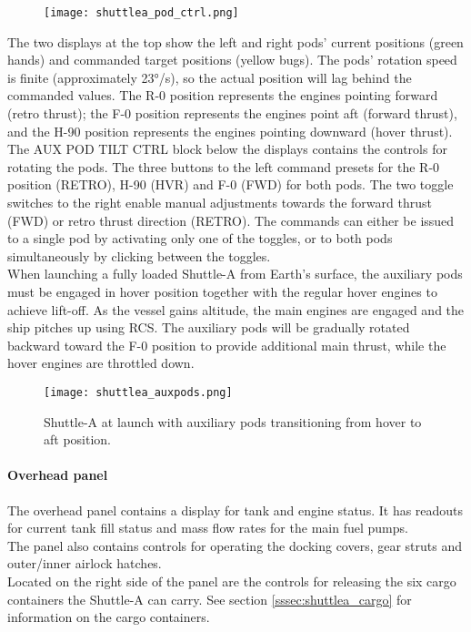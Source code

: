 \documentclass[Orbiter User Manual.tex]{subfiles}
\begin{document}
\begin{figure}[H]
  \centering
  \texttt{[image: shuttlea\_pod\_ctrl.png]}
\end{figure}

\noindent
The two displays at the top show the left and right pods' current positions (green hands) and commanded target positions (yellow bugs). The pods' rotation speed is finite (approximately 23°/s), so the actual position will lag behind the commanded values. The R-0 position represents the engines pointing forward (retro thrust); the F-0 position represents the engines point aft (forward thrust), and the H-90 position represents the engines pointing downward (hover thrust).\\
The AUX POD TILT CTRL block below the displays contains the controls for rotating the pods. The three buttons to the left command presets for the R-0 position (RETRO), H-90 (HVR) and F-0 (FWD) for both pods. The two toggle switches to the right enable manual adjustments towards the forward thrust (FWD) or retro thrust direction (RETRO). The commands can either be issued to a single pod by activating only one of the toggles, or to both pods simultaneously by clicking between the toggles.\\
When launching a fully loaded Shuttle-A from Earth's surface, the auxiliary pods must be engaged in hover position together with the regular hover engines to achieve lift-off. As the vessel gains altitude, the main engines are engaged and the ship pitches up using RCS. The auxiliary pods will be gradually rotated backward toward the F-0 position to provide additional main thrust, while the hover engines are throttled down.


\begin{figure}[H]
  \centering
  \texttt{[image: shuttlea\_auxpods.png]}
  \caption{Shuttle-A at launch with auxiliary pods transitioning from hover to aft position.}
\end{figure}

\paragraph{Overhead panel}
The overhead panel contains a display for tank and engine status. It has readouts for current tank fill status and mass flow rates for the main fuel pumps.~\\
The panel also contains controls for operating the docking covers, gear struts and outer/inner airlock hatches.\\
Located on the right side of the panel are the controls for releasing the six cargo containers the Shuttle-A can carry. See section \ref{sssec:shuttlea_cargo} for information on the cargo containers.
\end{document}
